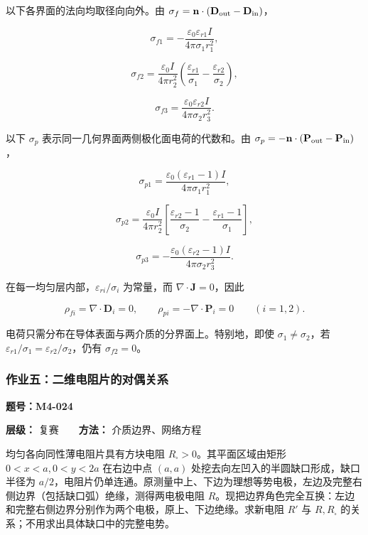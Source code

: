 以下各界面的法向均取径向向外。由
\(\sigma_f=\mathbf n\cdot(\mathbf D_{\rm out}-\mathbf D_{\rm in})\)，

\[
\boxed{
\sigma_{f1}
=-\frac{\varepsilon_0\varepsilon_{r1}I}
{4\pi\sigma_1r_1^2}
},
\]

\[
\boxed{
\sigma_{f2}
=\frac{\varepsilon_0I}{4\pi r_2^2}
\left(
\frac{\varepsilon_{r1}}{\sigma_1}
-\frac{\varepsilon_{r2}}{\sigma_2}
\right)
},
\]

\[
\boxed{
\sigma_{f3}
=\frac{\varepsilon_0\varepsilon_{r2}I}
{4\pi\sigma_2r_3^2}
}.
\]

以下 \(\sigma_p\) 表示同一几何界面两侧极化面电荷的代数和。由
\(\sigma_p=-\mathbf n\cdot(\mathbf P_{\rm out}-\mathbf P_{\rm in})\)，

\[
\boxed{
\sigma_{p1}
=\frac{\varepsilon_0(\varepsilon_{r1}-1)I}
{4\pi\sigma_1r_1^2}
},
\]

\[
\boxed{
\sigma_{p2}
=\frac{\varepsilon_0I}{4\pi r_2^2}
\left[
\frac{\varepsilon_{r2}-1}{\sigma_2}
-\frac{\varepsilon_{r1}-1}{\sigma_1}
\right]
},
\]

\[
\boxed{
\sigma_{p3}
=-\frac{\varepsilon_0(\varepsilon_{r2}-1)I}
{4\pi\sigma_2r_3^2}
}.
\]

在每一均匀层内部，\(\varepsilon_{ri}/\sigma_i\) 为常量，而
\(\nabla\cdot\mathbf J=0\)，因此

\[
\rho_{fi}=\nabla\cdot\mathbf D_i=0,
\qquad
\rho_{pi}=-\nabla\cdot\mathbf P_i=0
\qquad(i=1,2).
\]

电荷只需分布在导体表面与两介质的分界面上。特别地，即使
\(\sigma_1\ne\sigma_2\)，若
\(\varepsilon_{r1}/\sigma_1=\varepsilon_{r2}/\sigma_2\)，仍有
\(\sigma_{f2}=0\)。

\par{}
\noindent\begin{minipage}{\linewidth}

\subsubsection{作业五：二维电阻片的对偶关系}\label{m4:ux4f5cux4e1aux4e94ux4e8cux7ef4ux7535ux963bux7247ux7684ux5bf9ux5076ux5173ux7cfb}

\textbf{题号：M4-024}

\textbf{层级：} 复赛　　\textbf{方法：} 介质边界、网络方程

均匀各向同性薄电阻片具有方块电阻 \(R_{\square}>0\)。其平面区域由矩形
\(0<x<a,0<y<2a\) 在右边中点 \((a,a)\)
处挖去向左凹入的半圆缺口形成，缺口半径为
\(a/2\)，电阻片仍单连通。原测量中上、下边为理想等势电极，左边及完整右侧边界（包括缺口弧）绝缘，测得两电极电阻
\(R\)。现把边界角色完全互换：左边和完整右侧边界分别作为两个电极，原上、下边绝缘。求新电阻
\(R'\) 与 \(R,R_{\square}\) 的关系；不用求出具体缺口中的完整电势。

\end{minipage}\par

